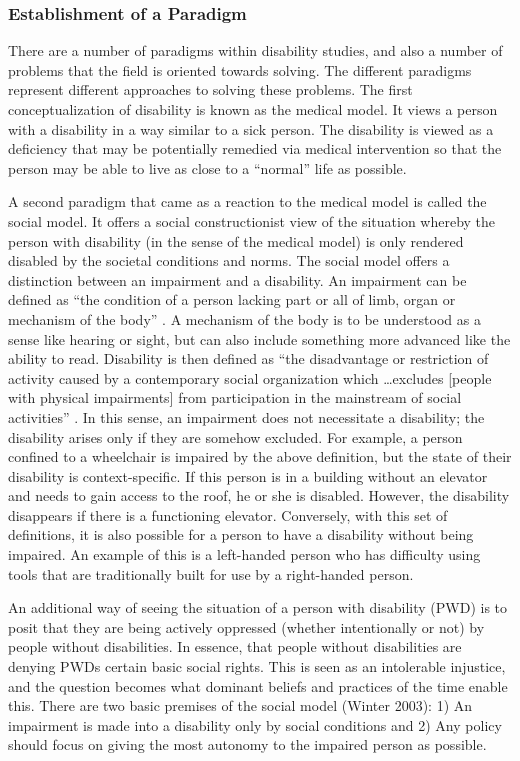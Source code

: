 \documentclass[a4paper]{article}
\begin{document}
\subsubsection{Establishment of a Paradigm}
\label{models}

There are a number of paradigms within disability studies, and also a number
of problems that the field is oriented towards solving. The different
paradigms represent different approaches to solving these problems. The first
conceptualization of disability is known as the medical model. It views a
person with a disability in a way similar to a sick person. The disability is
viewed as a deficiency that may be potentially remedied via medical
intervention so that the person may be able to live as close to a ``normal''
life as possible. 

A second paradigm that came as a reaction to the medical model is called the
social model. It offers a social constructionist view of the situation whereby
the person with disability (in the sense of the medical model) is only rendered
disabled by the societal conditions and norms. The social model offers a
distinction between an impairment and a disability. An impairment can be
defined as ``the condition of a person lacking part or all of limb, organ or
mechanism of the body'' \citep{winter2003development}. A mechanism of the body
is to be understood as a sense like hearing or sight, but can also include
something more advanced like the ability to read. Disability is then defined as
``the disadvantage or restriction of activity caused by a contemporary social
organization which \ldots excludes [people with physical impairments] from
participation in the mainstream of social activities''
\citep{winter2003development}. In this sense, an impairment does not
necessitate a disability; the disability arises only if they are somehow
excluded. For example, a person confined to a wheelchair is impaired by the
above definition, but the state of their disability is context-specific.  If
this person is in a building without an elevator and needs to gain access to
the roof, he or she is disabled. However, the disability disappears if there is
a functioning elevator. Conversely, with this set of definitions, it is also
possible for a person to have a disability without being impaired. An example
of this is a left-handed person who has difficulty using tools that are
traditionally built for use by a right-handed person.

An additional way of seeing the situation of a person with disability (PWD) is
to posit that they are being actively oppressed (whether intentionally or not)
by people without disabilities. In essence, that people without disabilities
are denying PWDs certain basic social rights. This is seen as an intolerable
injustice, and the question becomes what dominant beliefs and practices of the
time enable this. There are two basic premises of the social model (Winter
2003): 1) An impairment is made into a disability only by social conditions
and 2) Any policy should focus on giving the most autonomy to the impaired
person as possible.  
\end{document}
